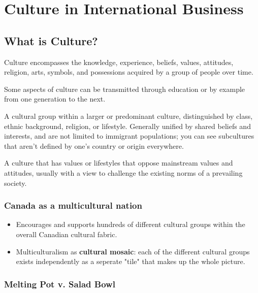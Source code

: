 \chapter{Culture in International Business}

\section{What is Culture?}

\begin{definition}[Culture]
    Culture encompasses the knowledge, experience, beliefs, values, 
    attitudes, religion, arts, symbols, and possessions acquired by a group 
    of people over time.
\end{definition}

Some aspects of culture can be transmitted through education or by example from one generation to the next.

\begin{definition}[Subculture]
    A cultural group within a larger or predominant culture, distinguished by class, 
    ethnic background, religion, or lifestyle. Generally unified by shared beliefs and interests,
    and are not limited to immigrant populations; you can see subcultures that aren't defined by 
    one's country or origin everywhere.
\end{definition}

\begin{definition}[Counterculture]
    A culture that has values or lifestyles that oppose mainstream values and attitudes,
    usually with a view to challenge the existing norms of a prevailing society.
\end{definition}

\subsection{Canada as a multicultural nation}
\begin{itemize}
    \item Encourages and supports hundreds of different cultural groups within the overall Canadian cultural fabric.
    \item Multiculturalism as \textbf{cultural mosaic}: each of the different cultural groups exists independently as a seperate "tile" that makes up the whole picture.
\end{itemize}

\subsection{Melting Pot v. Salad Bowl}

